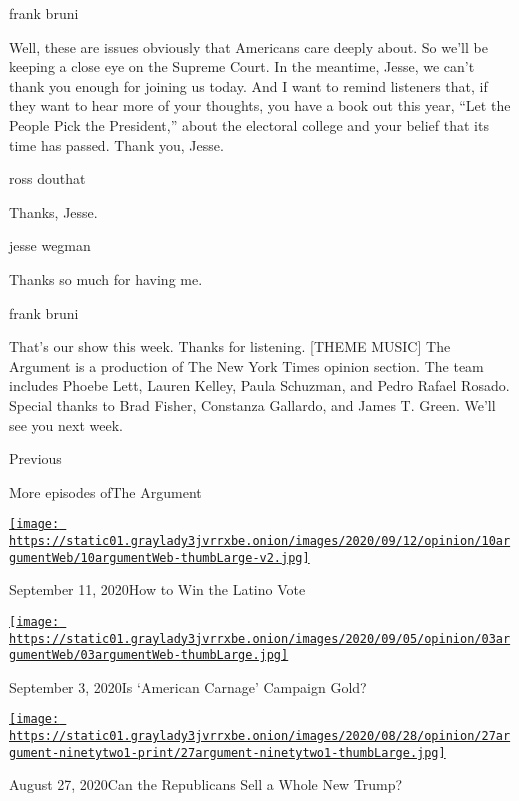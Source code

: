 frank bruni

Well, these are issues obviously that Americans care deeply about. So
we'll be keeping a close eye on the Supreme Court. In the meantime,
Jesse, we can't thank you enough for joining us today. And I want to
remind listeners that, if they want to hear more of your thoughts, you
have a book out this year, ``Let the People Pick the President,'' about
the electoral college and your belief that its time has passed. Thank
you, Jesse.

ross douthat

Thanks, Jesse.

jesse wegman

Thanks so much for having me.

frank bruni

That's our show this week. Thanks for listening. {[}THEME MUSIC{]} The
Argument is a production of The New York Times opinion section. The team
includes Phoebe Lett, Lauren Kelley, Paula Schuzman, and Pedro Rafael
Rosado. Special thanks to Brad Fisher, Constanza Gallardo, and James T.
Green. We'll see you next week.

Previous

More episodes ofThe Argument

\href{https://www.nytimes3xbfgragh.onion/2020/09/11/opinion/the-argument-latino-2020-vote.html?action=click\&module=audio-series-bar\&region=header\&pgtype=Article}{\texttt{[image: https://static01.graylady3jvrrxbe.onion/images/2020/09/12/opinion/10argumentWeb/10argumentWeb-thumbLarge-v2.jpg]}}

September 11, 2020How to Win the Latino Vote

\href{https://www.nytimes3xbfgragh.onion/2020/09/03/opinion/the-argument-trump-biden-kenosha-portland.html?action=click\&module=audio-series-bar\&region=header\&pgtype=Article}{\texttt{[image: https://static01.graylady3jvrrxbe.onion/images/2020/09/05/opinion/03argumentWeb/03argumentWeb-thumbLarge.jpg]}}

September 3, 2020Is `American Carnage' Campaign Gold?

\href{https://www.nytimes3xbfgragh.onion/2020/08/27/opinion/the-argument-republican-convention-trump.html?action=click\&module=audio-series-bar\&region=header\&pgtype=Article}{\texttt{[image: https://static01.graylady3jvrrxbe.onion/images/2020/08/28/opinion/27argument-ninetytwo1-print/27argument-ninetytwo1-thumbLarge.jpg]}}

August 27, 2020Can the Republicans Sell a Whole New Trump?

